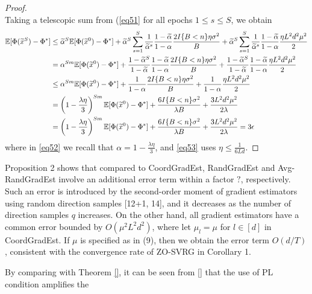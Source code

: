 \documentclass{article}
\newcommand*{\E}{\mathbb{E}}
\theoremstyle{definition}
\theoremstyle{remark}
\begin{document}
\begin{proof}
{\begin{equation}
\end{equation}
}
Taking a telescopic sum from (\eqref{eq51} for all epochs $1 \leq s \leq S$, we obtain
{\color{Brown}
\begin{align}
\E[\Phi(\widetilde{x}^S) - {\Phi}^*] & \leq \widetilde{\alpha}^{S} \E[\Phi(\widetilde{x}^0) - {\Phi}^*] + \widetilde{\alpha}^{S} \sum_{s=1}^S \frac{1}{\widetilde{\alpha}^s}\frac{1-\widetilde{\alpha}}{1-{\alpha}}\frac{2I\{B < n\}\eta \sigma ^2}{B} + \widetilde{\alpha}^{S} \sum_{s=1}^S \frac{1}{\widetilde{\alpha}^s}\frac{1-\widetilde{\alpha}}{1-{\alpha}}\frac{\eta L^2 d^2 \mu^2}{2}\notag\\
& = {\alpha}^{Sm} \E[\Phi(\widetilde{x}^0) - {\Phi}^*] + \frac{1-\widetilde{\alpha}^S}{1-\widetilde{\alpha}}\frac{1-\widetilde{\alpha}}{1-{\alpha}}\frac{2I\{B < n\}\eta \sigma ^2}{B}+ \frac{1-\widetilde{\alpha}^S}{1-\widetilde{\alpha}}\frac{1-\widetilde{\alpha}}{1-{\alpha}}\frac{\eta L^2 d^2 \mu^2}{2}\notag\\
& \leq {\alpha}^{Sm} \E[\Phi(\widetilde{x}^0) - {\Phi}^*] + \frac{1}{1-{\alpha}}\frac{2 I\{B < n\}\eta \sigma ^2}{B}+ \frac{1}{1-{\alpha}}\frac{\eta L^2 d^2 \mu^2}{2}\notag\\
& = \left(1-\frac{\lambda\eta}{3}\right)^{Sm} \E[\Phi(\widetilde{x}^0) - {\Phi}^*] + \frac{6I\{B < n\} \sigma ^2}{\lambda B}+\frac{3 L^2 d^2 \mu^2}{2\lambda}\label{eq52}\\
& = \left(1-\frac{\lambda\eta}{3}\right)^{Sm} \E[\Phi(\widetilde{x}^0) - {\Phi}^*] + \frac{6I\{B < n\} \sigma ^2}{\lambda B}+\frac{3 L^2 d^2 \mu^2}{2\lambda}= 3 \epsilon\label{eq53}
\end{align}
}
where in \eqref{eq52} we recall that {\color{Brown}$\alpha = 1-\frac{\lambda\eta}{3}$}, and \eqref{eq53} uses {\color{Brown}$\eta \leq \frac{1}{6Ld}$}.
\end{proof}
{\color{Brown}Proposition 2 shows that compared to CoordGradEst, RandGradEst and Avg-RandGradEst involve an additional error term within a factor $?$, respectively. Such
an error is introduced by the second-order moment of gradient estimators using random direction
samples [12+1, 14], and it decreases as the number of direction samples $q$ increases. On the other hand, all gradient estimators have a common error bounded by $O(\mu^2L^2d^2)$, where let $\mu_l = \mu$ for $l\in[d]$ in
CoordGradEst. If $\mu$ is specified as in (9), then we obtain the error term $O(d/T)$, consistent with the convergence rate of ZO-SVRG in Corollary 1.

}
By comparing with Theorem \ref{}, it can be seen from \eqref{} that the use of PL condition amplifies the
\end{document}
